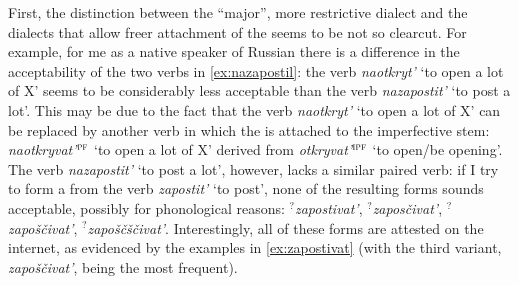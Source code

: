 First, the distinction between the ``major'', more restrictive dialect and the dialects that allow freer attachment of the   seems to be not so clearcut. For example, for me as a native speaker of Russian there is a difference in the acceptability of the two verbs in \ref{ex:nazapostil}: the verb \textit{naotkryt'} `to open a lot of X' seems to be considerably less acceptable than the verb \textit{nazapostit'} `to post a lot'. This may be due to the fact that the verb \textit{naotkryt'} `to open a lot of X' can be replaced by another verb in which the   is attached to the imperfective stem: \textit{naotkryvat'}$^{\textsc{pf}}$ `to open a lot of X' derived from \textit{otkryvat'}$^{\textsc{ipf}}$ `to open/be opening'. The verb \textit{nazapostit'} `to post a lot', however, lacks a similar paired verb: if I try to form a  from the verb \textit{zapostit'} `to post', none of the resulting forms sounds acceptable, possibly for phonological reasons: $^?$\textit{zapostivat'}, $^?$\textit{zapos\v{c}ivat'}, $^?$\textit{zapo\v{s}\v{c}ivat'}, $^?$\textit{zapo\v{s}\v{c}\v{s}\v{c}ivat'}. Interestingly, all of these forms are attested on the internet, as evidenced by the examples in \ref{ex:zapostivat} (with the third variant, \textit{zapo\v{s}\v{c}ivat'}, being the most frequent).

